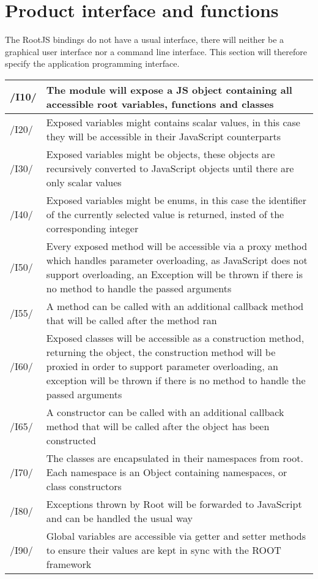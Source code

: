 \chapter{Product interface and functions}
The RootJS bindings do not have a usual interface, there will neither be a graphical user interface nor a command line interface.
This section will therefore specify the application programming interface.


\begin{longtable}{|p{1cm} | p{15cm}|}
   \hline
  /I10/ & The module will expose a JS object containing all accessible root variables, functions and classes \\
  \hline
  /I20/ & Exposed variables might contains scalar values, in this case they will be accessible in their JavaScript counterparts \\
  \hline
  /I30/ & Exposed variables might be objects, these objects are recursively converted to JavaScript objects until there are only scalar values \\
  \hline
  /I40/ & Exposed variables might be enums, in this case the identifier of the currently selected value is returned, insted of the corresponding integer \\
  \hline
  /I50/ & Every exposed method will be accessible via a proxy method which handles parameter overloading, as JavaScript does not support overloading, an Exception will be thrown if there is no method to handle the passed arguments \\
  \hline
  /I55/ & A method can be called with an additional callback method that will be called after the method ran \\
  \hline
  /I60/ & Exposed classes will be accessible as a construction method, returning the object, the construction method will be proxied in order to support parameter overloading, an exception will be thrown if there is no method to handle the passed arguments \\
  \hline
  /I65/ & A constructor can be called with an additional callback method that will be called after the object has been constructed \\
  \hline
  /I70/ & The classes are encapsulated in their namespaces from root. Each namespace is an Object containing namespaces, or class constructors \\
  \hline
  /I80/ & Exceptions thrown by Root will be forwarded to JavaScript and can be handled the usual way \\
  \hline
  /I90/ & Global variables are accessible via getter and setter methods to ensure their values are kept in sync with the ROOT framework \\
   \hline
\end{longtable}
